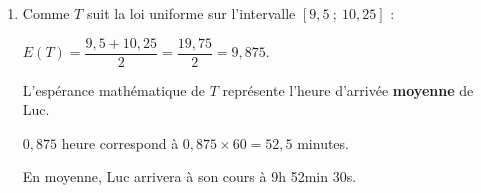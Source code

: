 \begin{corrige}
\begin{enumerate}
          \item %
          Comme $T$ suit la loi uniforme sur l'intervalle $[9,5~;~10,25]$ :
          \par
          $E(T)=\dfrac{9,5+10,25}{2}=\dfrac{19,75}{2}=9,875$.
          \par
          L'espérance mathématique de $T$ représente l'heure d'arrivée \textbf{moyenne} de Luc.
          \par
          $0,875$ heure correspond à $0,875 \times 60 = 52,5$ minutes.
          \par
          En moyenne, Luc arrivera à son cours à 9h 52min 30s.
          \par
          \par
     \end{enumerate}
\end{corrige}
